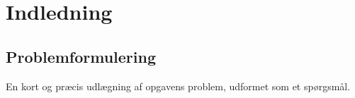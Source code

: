 \section{Indledning}
\subsection{Problemformulering}
En kort og præcis udlægning af opgavens problem, udformet som et spørgsmål.
